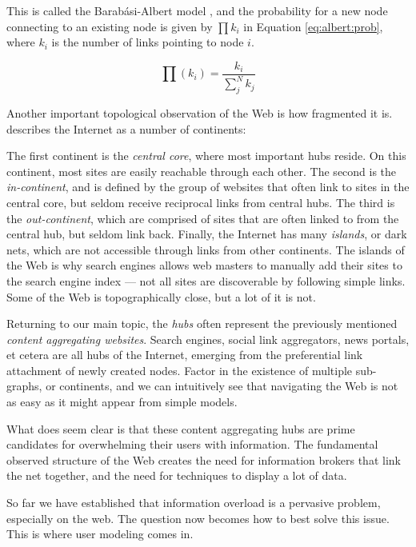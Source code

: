 This is called the Barab\'{a}si-Albert model \citep{Albert1999}, 
and the probability for a new node connecting to an existing node is given by $\prod k_i$ in Equation \ref{eq:albert:prob}, 
where $k_i$ is the number of links pointing to node $i$. 

\begin{equation}\label{eq:albert:prob}
  \prod(k_i)  = \frac{k_i}{\sum_{j}^N k_j}
\end{equation} 

\vspace{1em}
\noindent
Another important topological observation of the Web is how fragmented it is. 
\citet[p166]{Barabasi2003} describes the Internet as a number of continents:

The first continent is the \emph{central core}, where most important hubs reside. On this continent, most sites are easily reachable through each other.
The second is the \emph{in-continent}, and is defined by the group of websites that often link to sites in the central core, but seldom receive reciprocal links from central hubs.
The third is the \emph{out-continent}, which are comprised of sites that are often linked to from the central hub, but seldom link back.
Finally, the Internet has many \emph{islands}, or dark nets, which are not accessible through links from other continents. 
The islands of the Web is why search engines allows web masters to manually add their sites to the search engine index --- not all sites are discoverable by following simple links. Some of the Web is topographically close, but a lot of it is not.

Returning to our main topic, the \emph{hubs} often represent the previously mentioned \emph{content aggregating websites}. 
Search engines, social link aggregators, news portals, et cetera are all hubs of the Internet, emerging from the preferential 
link attachment of newly created nodes. 
Factor in the existence of multiple sub-graphs, or continents, and we can intuitively see that navigating the Web is not as 
easy as it might appear from simple models.

What does seem clear is that these content aggregating hubs are prime candidates for overwhelming their users with information. 
The fundamental observed structure of the Web creates the need for information brokers that link the net together, 
and the need for techniques to display a lot of data. 

So far we have established that information overload is a pervasive problem, especially on the web.
The question now becomes how to best solve this issue. 
This is where user modeling comes in.


